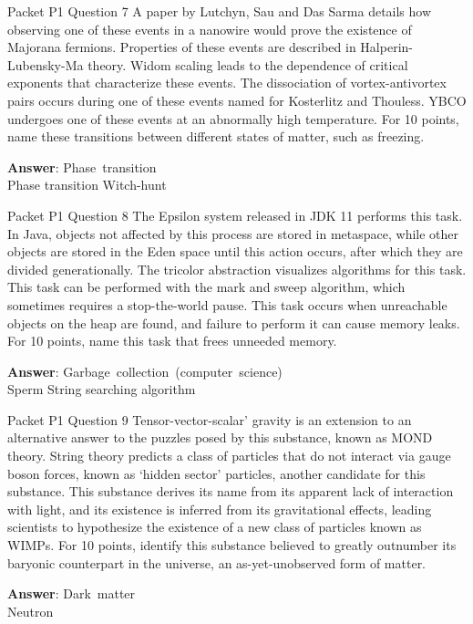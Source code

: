 \begin{frame}{Packet P1 Question 7}
A paper by Lutchyn, Sau and Das Sarma details how observing one of these events in a nanowire would prove the existence of Majorana fermions. Properties of these events are described in Halperin-Lubensky-Ma theory. Widom scaling leads to the dependence of critical exponents that characterize these events. The dissociation of vortex-antivortex pairs occurs during one of these events named for Kosterlitz and Thouless. YBCO     undergoes one of these events at an abnormally high temperature. For 10 points, name these transitions between different states of matter, such as freezing.    

\textbf{Answer}: Phase\ transition\\
 Phase transition
 Witch-hunt
\end{frame}

\begin{frame}{Packet P1 Question 8}
The Epsilon system released in JDK 11 performs this task. In Java, objects not affected by this process are stored in metaspace,   while other objects are stored in the Eden space until this action occurs, after which they are divided generationally. The tricolor abstraction visualizes algorithms for this   task. This task can be performed with the mark and sweep   algorithm, which sometimes requires a stop-the-world pause. This task occurs when unreachable objects on the heap are found, and failure to perform it can cause memory leaks. For 10 points, name this task that frees unneeded     memory.

\textbf{Answer}: Garbage\ collection\ (computer\ science)\\
 Sperm
 String searching algorithm
\end{frame}

\begin{frame}{Packet P1 Question 9}
Tensor-vector-scalar' gravity is an extension to an alternative answer to the puzzles posed by this substance, known as MOND theory. String theory predicts a class of particles that do not interact via gauge boson forces, known as `hidden sector' particles, another candidate for this substance. This substance derives its name from its apparent lack of interaction with light, and its existence is inferred from its gravitational effects, leading scientists to hypothesize the existence of a new class of particles known as WIMPs. For 10 points,   identify this substance   believed to greatly outnumber its baryonic counterpart   in the universe, an as-yet-unobserved form of matter.  

\textbf{Answer}: Dark\ matter\\
 Neutron
\end{frame}

